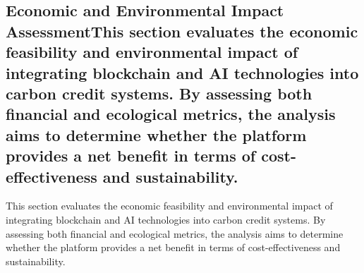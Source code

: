\documentclass[preprint,12pt]{elsarticle}
\begin{document}
\subsection{Economic and Environmental Impact AssessmentThis section evaluates the economic feasibility and environmental impact of integrating blockchain and AI technologies into carbon credit systems. By assessing both financial and ecological metrics, the analysis aims to determine whether the platform provides a net benefit in terms of cost-effectiveness and sustainability.}
This section evaluates the economic feasibility and environmental impact of integrating blockchain and AI technologies into carbon credit systems. By assessing both financial and ecological metrics, the analysis aims to determine whether the platform provides a net benefit in terms of cost-effectiveness and sustainability.
\end{document}
